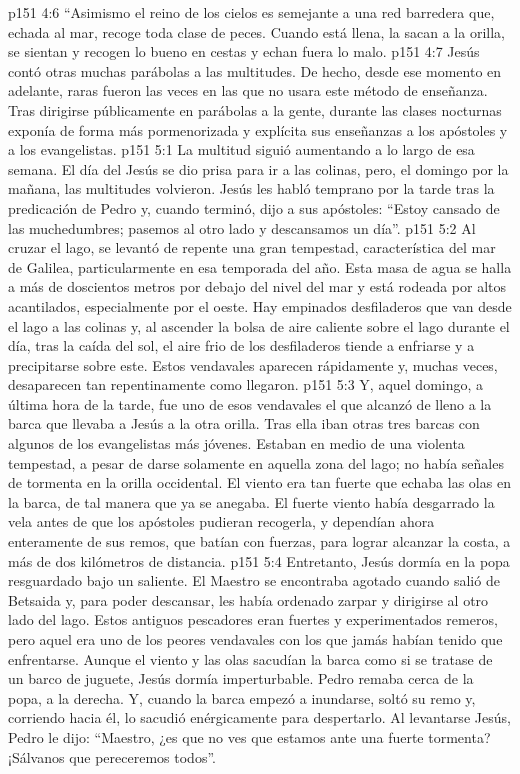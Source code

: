 \vs p151 4:6 \pc “Asimismo el reino de los cielos es semejante a una red barredera que, echada al mar, recoge toda clase de peces. Cuando está llena, la sacan a la orilla, se sientan y recogen lo bueno en cestas y echan fuera lo malo.
\vs p151 4:7 \pc Jesús contó otras muchas parábolas a las multitudes. De hecho, desde ese momento en adelante, raras fueron las veces en las que no usara este método de enseñanza. Tras dirigirse públicamente en parábolas a la gente, durante las clases nocturnas exponía de forma más pormenorizada y explícita sus enseñanzas a los apóstoles y a los evangelistas.
\vs p151 5:1 La multitud siguió aumentando a lo largo de esa semana. El día del  Jesús se dio prisa para ir a las colinas, pero, el domingo por la mañana, las multitudes volvieron. Jesús les habló temprano por la tarde tras la predicación de Pedro y, cuando terminó, dijo a sus apóstoles: “Estoy cansado de las muchedumbres; pasemos al otro lado y descansamos un día”.
\vs p151 5:2 Al cruzar el lago, se levantó de repente una gran tempestad, característica del mar de Galilea, particularmente en esa temporada del año. Esta masa de agua se halla a más de doscientos metros por debajo del nivel del mar y está rodeada por altos acantilados, especialmente por el oeste. Hay empinados desfiladeros que van desde el lago a las colinas y, al ascender la bolsa de aire caliente sobre el lago durante el día, tras la caída del sol, el aire frio de los desfiladeros tiende a enfriarse y a precipitarse sobre este. Estos vendavales aparecen rápidamente y, muchas veces, desaparecen tan repentinamente como llegaron.
\vs p151 5:3 Y, aquel domingo, a última hora de la tarde, fue uno de esos vendavales el que alcanzó de lleno a la barca que llevaba a Jesús a la otra orilla. Tras ella iban otras tres barcas con algunos de los evangelistas más jóvenes. Estaban en medio de una violenta tempestad, a pesar de darse solamente en aquella zona del lago; no había señales de tormenta en la orilla occidental. El viento era tan fuerte que echaba las olas en la barca, de tal manera que ya se anegaba. El fuerte viento había desgarrado la vela antes de que los apóstoles pudieran recogerla, y dependían ahora enteramente de sus remos, que batían con fuerzas, para lograr alcanzar la costa, a más de dos kilómetros de distancia.
\vs p151 5:4 Entretanto, Jesús dormía en la popa resguardado bajo un saliente. El Maestro se encontraba agotado cuando salió de Betsaida y, para poder descansar, les había ordenado zarpar y dirigirse al otro lado del lago. Estos antiguos pescadores eran fuertes y experimentados remeros, pero aquel era uno de los peores vendavales con los que jamás habían tenido que enfrentarse. Aunque el viento y las olas sacudían la barca como si se tratase de un barco de juguete, Jesús dormía imperturbable. Pedro remaba cerca de la popa, a la derecha. Y, cuando la barca empezó a inundarse, soltó su remo y, corriendo hacia él, lo sacudió enérgicamente para despertarlo. Al levantarse Jesús, Pedro le dijo: “Maestro, ¿es que no ves que estamos ante una fuerte tormenta? ¡Sálvanos que pereceremos todos”.
